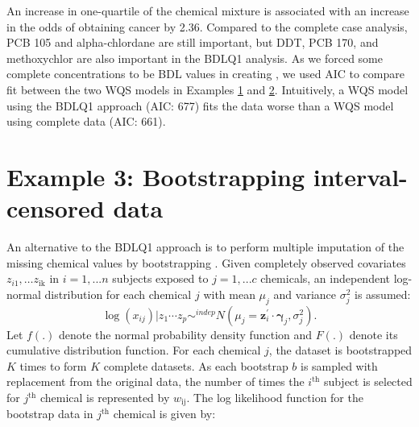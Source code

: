 An increase in one-quartile of the chemical mixture is associated with
an increase in the odds of obtaining cancer by 2.36. Compared to the
complete case analysis, PCB 105 and alpha-chlordane are still important,
but DDT, PCB 170, and methoxychlor are also important in the BDLQ1
analysis. As we forced some complete concentrations
 to be BDL values in creating
, we used AIC to compare fit between the two WQS
models in Examples \protect\hyperlink{Example-1}{1} and
\protect\hyperlink{Example-2}{2}. Intuitively, a WQS model using the
BDLQ1 approach (AIC: 677) fits the data worse than a WQS model using
complete data (AIC: 661).

\hypertarget{example-3-bootstrapping-interval-censored-data}{%
\section{Example 3: Bootstrapping interval-censored
data}\label{example-3-bootstrapping-interval-censored-data}}

An alternative to the BDLQ1 approach is to perform multiple imputation
of the missing chemical values by bootstrapping
\citep{lubinEpidemiologicEvaluationMeasurement2004}. Given completely
observed covariates \(z_{i1},\ldots z_{\text{ik}}\) in \(i=1, ...n\)
subjects exposed to \(j=1,...c\) chemicals, an independent log-normal
distribution for each chemical \(j\) with mean \(\mu_{j}\) and variance
\(\sigma^2_j\) is assumed:
\[\log(x_{ij})| z_1 \cdots z_p \sim ^{indep} N \left(\mu_j = \boldsymbol{z}_i^\prime \cdot \boldsymbol{\gamma}_j, \sigma^2_j \right) .\]
Let \(f(.)\) denote the normal probability density function and \(F(.)\)
denote its cumulative distribution function. For each chemical \(j\),
the dataset is bootstrapped \(K\) times to form \(K\) complete datasets.
As each bootstrap \(b\) is sampled with replacement from the original
data, the number of times the \(i^{\text{th}}\) subject is selected for
\(j^{\text{th}}\) chemical is represented by \(w_{\text{ij}}\). The log
likelihood function for the bootstrap data in \(j^{\text{th}}\) chemical
is given by:

